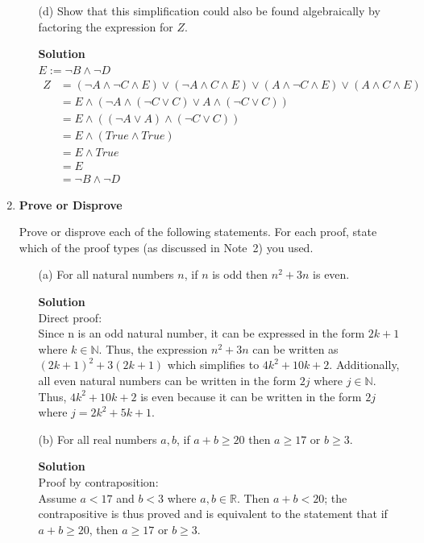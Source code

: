 \documentclass{article}\usepackage{amsmath,amssymb,amsthm,tikz,tkz-graph,color,chngpage,soul,hyperref,csquotes,graphicx,floatrow}\newcommand*{\QEDB}{\hfill\ensuremath{\square}}\newtheorem*{prop}{Proposition}\usepackage[shortlabels]{enumitem}\usepackage[nobreak=true]{mdframed}\usetikzlibrary{matrix,calc}\MakeOuterQuote{"}\usepackage[margin=1in]{geometry} \newtheorem{theorem}{Theorem} \usepackage{circuitikz}
\begin{document}
\begin{enumerate}
\begin{enumerate}
\item[(d)] Show that this simplification could also be found algebraically by factoring the expression for $Z$.
\begin{mdframed} \textbf{Solution} \\
$E:= \neg B \land \neg D$\\
\begin{equation}
\begin{split}
    Z & = (\neg A \land \neg C \land E) \lor (\neg A \land C \land E) \lor (A \land \neg C \land E) \lor (A \land C \land E)  \\
  & = E \land (\neg A \land (\neg C \lor C) \lor A \land (\neg C \lor C))\\
 & = E \land ((\neg A \lor A) \land (\neg C \lor C))\\
 & = E \land (True \land True) \\
 & = E \land True \\
 & = E\\
 & = \neg B \land \neg D
\end{split}
\end{equation}
\end{mdframed}
\end{enumerate}


\item \textbf{Prove or Disprove}

Prove or disprove each of the following statements. For each proof, state which of the proof types (as discussed in Note~2) you used.
\begin{enumerate}
\item[(a)] For all natural numbers $n$, if $n$ is odd then $n^2+3n$ is even.
\begin{mdframed} \textbf{Solution} \\
Direct proof: \\
Since n is an odd natural number, it can be expressed in the form $2k+1$ where $k \in \mathbb{N}$. Thus, the expression $n^2+3n$ can be written as $(2k+1)^2+3(2k+1)$ which simplifies to $4k^2+10k+2$. Additionally, all even natural numbers can be written in the form $2j$ where $j \in \mathbb{N}$. Thus, $4k^2+10k+2$ is even because it can be written in the form $2j$ where $j=2k^2+5k+1$.
\end{mdframed}

\item[(b)] For all real numbers $a,b$, if $a+b \ge 20$ then $a\ge 17$ or $b\ge 3$.
\begin{mdframed} \textbf{Solution} \\
Proof by contraposition: \\
Assume $a < 17$ and $b < 3$ where $a,b \in \mathbb{R}$. Then $a+b < 20$; the contrapositive is thus proved and is equivalent to the statement that if $a+b \geq 20$, then $a \geq 17$ or $b \geq 3$.
\end{mdframed}


\end{enumerate}
\end{enumerate}
\end{document}
